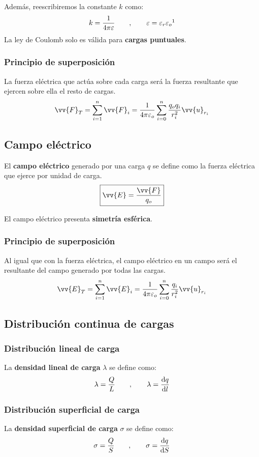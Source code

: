 \documentclass[a4paper]{book}
\numberwithin{figure}{chapter}
\numberwithin{equation}{chapter}
\renewcommand{\vec}[1]{\vv{{#1}}}
\begin{document}
Además, reescribiremos la constante $k$ como:
\[k= \frac{1}{4\pi\varepsilon} \qquad ,\qquad \varepsilon = \varepsilon _r \varepsilon _o \footnotemark\]
La ley de Coulomb solo es válida para \textbf{cargas puntuales}.

\subsubsection{Principio de superposición}
La fuerza eléctrica que actúa sobre cada carga será la fuerza resultante que ejercen sobre ella el resto de cargas.
\[\vec{F}_T = \sum_{i=1}^{n}{\vec{F}_i} = \frac{1}{4\pi\varepsilon_o}\sum^{n}_{i=0}{\frac{q_oq_i}{r_i^2}\vec{u}_{r_{i}}}\]


\subsection{Campo eléctrico}
El \textbf{campo eléctrico} generado por una carga $q$ se define como la fuerza eléctrica que ejerce  por unidad de carga.
\[\boxed{\vec{E}=\frac{\vec{F}}{q_o}}\]

El campo eléctrico presenta \textbf{simetría esférica}.
\subsubsection{Principio de superposición}
Al igual que con la fuerza eléctrica, el campo eléctrico en un campo será el resultante del campo generado por todas las cargas.
\[\vec{E}_T = \sum_{i=1}^{n}{\vec{E}_i} = \frac{1}{4\pi\varepsilon_o}\sum^{n}_{i=0}{\frac{q_i}{r_i^2}\vec{u}_{r_{i}}}\]

\subsection{Distribución continua de cargas}
\subsubsection{Distribución lineal de carga}
La \textbf{densidad lineal de carga} $\lambda$ se define como:
\[\lambda = \frac{Q}{L}\qquad ,\qquad \lambda = \dv{q}{l}\]
\subsubsection{Distribución superficial de carga}
La \textbf{densidad superficial de carga} $\sigma$ se define como:
\[\sigma = \frac{Q}{S}\qquad ,\qquad \sigma = \dv{q}{S}\]
\end{document}
